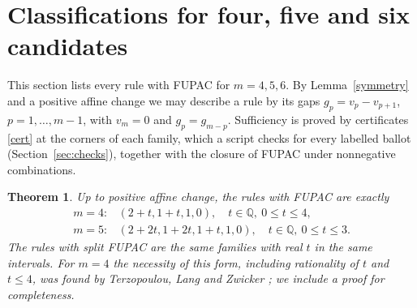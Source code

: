 \documentclass[11pt,a4paper]{article}
\newtheorem{theorem}{Theorem}
\theoremstyle{definition}
\theoremstyle{remark}
\begin{document}
\section{Classifications for four, five and six candidates}\label{sec:classification}
This section lists every rule with FUPAC for $m=4,5,6$. By Lemma~\ref{symmetry} and a positive affine change we may describe a rule by its gaps $g_p=v_p-v_{p+1}$, $p=1,\ldots,m-1$, with $v_m=0$ and $g_p=g_{m-p}$. Sufficiency is proved by certificates \eqref{cert} at the corners of each family, which a script checks for every labelled ballot (Section~\ref{sec:checks}), together with the closure of FUPAC under nonnegative combinations.

\begin{theorem}\label{classification}
Up to positive affine change, the rules with FUPAC are exactly
\[
\begin{array}{ll}
m=4: &(2+t,1+t,1,0),\quad t\in\mathbb Q,\ 0\le t\le4,\\
m=5: &(2+2t,1+2t,1+t,1,0),\quad t\in\mathbb Q,\ 0\le t\le3.
\end{array}
\]
The rules with split FUPAC are the same families with real $t$ in the same intervals. For $m=4$ the necessity of this form, including rationality of $t$ and $t\le4$, was found by Terzopoulou, Lang and Zwicker \cite[note~11]{tlz}; we include a proof for completeness.
\end{theorem}
\end{document}
